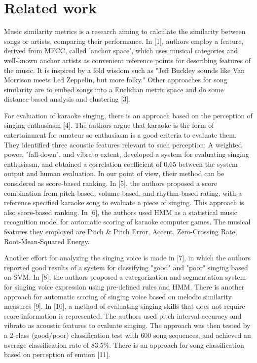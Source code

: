 \documentclass[paper=a4, fontsize=11pt, DIV=13]{scrartcl}
\begin{document}
\section{Related work}
Music similarity metrics is a research aiming to calculate the similarity between songs or artists, comparing their performance. In [1], authors employ a feature, derived from MFCC, called 'anchor space', which uses musical categories and well-known anchor artists as convenient reference points for describing features of the music. It is inspired by a fold wisdom such as "Jeff Buckley sounds like Van Morrison meets Led Zeppelin, but more folky." Other approaches for song similarity are to embed songs into a Euclidian metric space and do some distance-based analysis and clustering [3].

For evaluation of karaoke singing, there is an approach based on the perception of singing enthusiasm [4]. The authors argue that karaoke is the form of entertainment for amateur so enthusiasm is a good criteria to evaluate them. They identified three acoustic features relevant to such perception: A weighted power, "fall-down", and vibrato extent, developed a system for evaluating singing enthusiasm, and obtained a correlation coefficient of 0.65 between the system output and human evaluation. In our point of view, their method can be considered as score-based ranking. In [5], the authors proposed a score combination from pitch-based, volume-based, and rhythm-based rating, with a reference specified karaoke song to evaluate a piece of singing. This approach is also score-based ranking. In [6], the authors used HMM as a statistical music recognition model for automatic scoring of karaoke computer games. The musical features they employed are Pitch \& Pitch Error, Accent, Zero-Crossing Rate, Root-Mean-Squared Energy.

Another effort for analyzing the singing voice is made in [7], in which the authors reported good results of a system for classifying "good" and "poor" singing based on SVM. In [8], the authors proposed a categorization and segmentation system for singing voice expression using pre-defined rules and HMM. There is another approach for automatic scoring of singing voice based on melodic similarity measures [9]. In [10], a method of evaluating singing skills that does not require score information is represented. The authors used pitch interval accuracy and vibrato as acoustic features to evaluate singing. The approach was then tested by a 2-class (good/poor) classification test with 600 song sequences, and achieved an average classification rate of 83.5\%. There is an approach for song classification based on perception of emtion [11].
\end{document}
